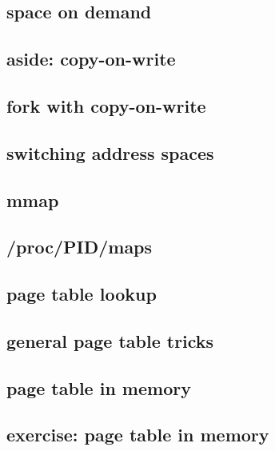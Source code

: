\subsection{space on demand}


\subsection{aside: copy-on-write}


\subsection{fork with copy-on-write}


\subsection{switching address spaces}


\subsection{mmap}


\subsection{/proc/PID/maps}


\subsection{page table lookup}
 


\subsection{general page table tricks}


\subsection{page table in memory}



\subsection{exercise: page table in memory}

